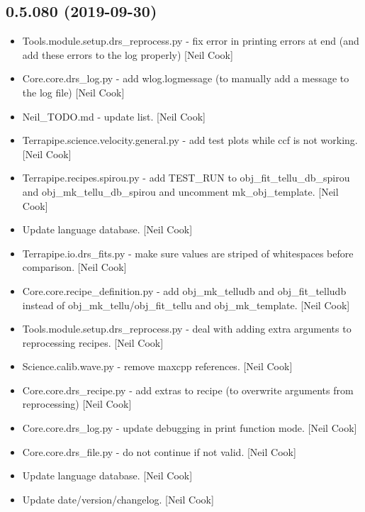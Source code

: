 \documentclass[a4paper,10pt,english]{report}
\begin{document}
\subsection{0.5.080 (2019-09-30)}
\label{\detokenize{misc/changelog:id61}}\begin{itemize}
\item {} 
Tools.module.setup.drs\_reprocess.py - fix error in printing errors at
end (and add these errors to the log properly) {[}Neil Cook{]}

\item {} 
Core.core.drs\_log.py - add wlog.logmessage (to manually add a message
to the log file) {[}Neil Cook{]}

\item {} 
Neil\_TODO.md - update list. {[}Neil Cook{]}

\item {} 
Terrapipe.science.velocity.general.py - add test plots while ccf is
not working. {[}Neil Cook{]}

\item {} 
Terrapipe.recipes.spirou.py - add TEST\_RUN to obj\_fit\_tellu\_db\_spirou
and obj\_mk\_tellu\_db\_spirou and uncomment mk\_obj\_template. {[}Neil Cook{]}

\item {} 
Update language database. {[}Neil Cook{]}

\item {} 
Terrapipe.io.drs\_fits.py - make sure values are striped of whitespaces
before comparison. {[}Neil Cook{]}

\item {} 
Core.core.recipe\_definition.py - add obj\_mk\_telludb and
obj\_fit\_telludb instead of obj\_mk\_tellu/obj\_fit\_tellu and
obj\_mk\_template. {[}Neil Cook{]}

\item {} 
Tools.module.setup.drs\_reprocess.py - deal with adding extra arguments
to reprocessing recipes. {[}Neil Cook{]}

\item {} 
Science.calib.wave.py - remove maxcpp references. {[}Neil Cook{]}

\item {} 
Core.core.drs\_recipe.py - add extras to recipe (to overwrite arguments
from reprocessing) {[}Neil Cook{]}

\item {} 
Core.core.drs\_log.py - update debugging in print function mode. {[}Neil
Cook{]}

\item {} 
Core.core.drs\_file.py - do not continue if not valid. {[}Neil Cook{]}

\item {} 
Update language database. {[}Neil Cook{]}

\item {} 
Update date/version/changelog. {[}Neil Cook{]}

\end{itemize}
\end{document}
